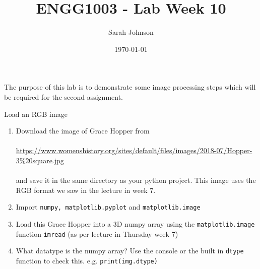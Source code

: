 \documentclass{lab}
\title{ENGG1003 - Lab Week 10}
\author{Sarah Johnson}
\date{\today}
\begin{document}
\maketitle

The purpose of this lab is to demonstrate some image processing steps which will be required for the second assignment.

\begin{task}{Load an RGB image}{}


\begin{enumerate}
\item Download the image of Grace Hopper from \\~\\ \url{https://www.womenshistory.org/sites/default/files/images/2018-07/Hopper-3\%20square.jpg} \\~\\
and save it in the same directory as your python project. This image uses the RGB format we saw in the lecture in week 7.
\item Import \texttt{numpy, matplotlib.pyplot} and \texttt{matplotlib.image}
\item Load this Grace Hopper into a 3D numpy array using the \texttt{matplotlib.image} function \texttt{imread} (as per lecture in Thursday week 7)
\item 	What datatype is the numpy array? Use the console or the built in \texttt{dtype} function to check this. e.g. \texttt{print(img.dtype)}
\end{enumerate}
\end{task}
\end{document}
